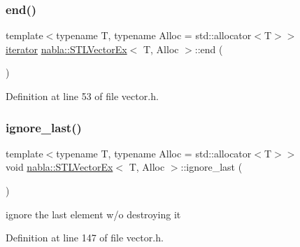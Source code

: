 \subsubsection{\texorpdfstring{end()}{end()}}
{\footnotesize\ttfamily template$<$typename T, typename Alloc = std\+::allocator$<$\+T$>$$>$ \\
\mbox{\hyperlink{classnabla_1_1_s_t_l_vector_ex_a4bd3bc9bbe369d76e958f3180c22f40b}{iterator}} \mbox{\hyperlink{classnabla_1_1_s_t_l_vector_ex}{nabla\+::\+S\+T\+L\+Vector\+Ex}}$<$ T, Alloc $>$\+::end (\begin{DoxyParamCaption}{ }\end{DoxyParamCaption})\hspace{0.3cm}{\ttfamily [inline]}}



Definition at line 53 of file vector.\+h.

\mbox{\label{classnabla_1_1_s_t_l_vector_ex_a8be72171d8b6128e38d0810b27b622d8}} 
\subsubsection{\texorpdfstring{ignore\_last()}{ignore\_last()}}
{\footnotesize\ttfamily template$<$typename T, typename Alloc = std\+::allocator$<$\+T$>$$>$ \\
void \mbox{\hyperlink{classnabla_1_1_s_t_l_vector_ex}{nabla\+::\+S\+T\+L\+Vector\+Ex}}$<$ T, Alloc $>$\+::ignore\+\_\+last (\begin{DoxyParamCaption}{ }\end{DoxyParamCaption})\hspace{0.3cm}{\ttfamily [inline]}}

ignore the last element w/o destroying it 

Definition at line 147 of file vector.\+h.

\mbox{\label{classnabla_1_1_s_t_l_vector_ex_abc8284cabd99f5a4ba0fc971e98630ab}} 

